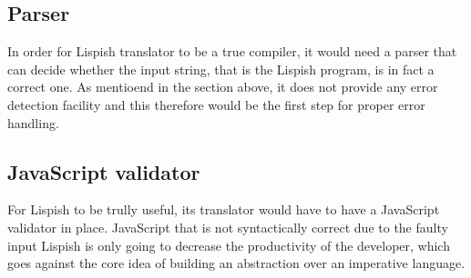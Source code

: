 \subsection{Parser}
In order for Lispish translator to be a true compiler, it would need a parser that can decide whether the input string, that is the Lispish program, is in fact a correct one. As mentioend in the section above, it does not provide any error detection facility and this therefore would be the first step for proper error handling. 
\subsection{JavaScript validator}
For Lispish to be trully useful, its translator would have to have a JavaScript validator in place. 
JavaScript that is not syntactically correct due to the faulty input Lispish is only going to decrease the productivity of the developer, which goes against the core idea of building an abstraction over an imperative language.
